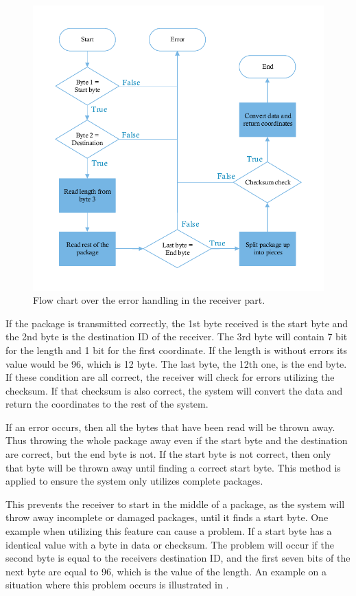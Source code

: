 \begin{figure}[H]
\centering
\includegraphics[scale=1.2]{figures/FlowReceiver.pdf}
\caption{Flow chart over the error handling in the receiver part.}
\label{FlowReceiver}
\end{figure}

If the package is transmitted correctly, the 1st byte received is the start byte and the 2nd byte is the destination ID of the receiver. The 3rd byte will contain 7 bit for the length and 1 bit for the first coordinate. If the length is without errors its value would be 96, which is 12 byte. The last byte, the 12th one, is the end byte. If these condition are all correct, the receiver will check for errors utilizing the checksum. If that checksum is also correct, the system will convert the data and return the coordinates to the rest of the system.

If an error occurs, then all the bytes that have been read will be thrown away. Thus throwing the whole package away even if the start byte and the destination are correct, but the end byte is not. If the start byte is not correct, then only that byte will be thrown away until finding a correct start byte. This method is applied to ensure the system only utilizes complete packages.

This prevents the receiver to start in the middle of a package, as the system will throw away incomplete or damaged packages, until it finds a start byte. One example when utilizing this feature can cause a problem. If a start byte has a identical value with a byte in data or checksum. The problem will occur if the second byte is equal to the receivers destination ID, and the first seven bits of the next byte are equal to 96, which is the value of the length. An example on a situation where this problem occurs is illustrated in .

